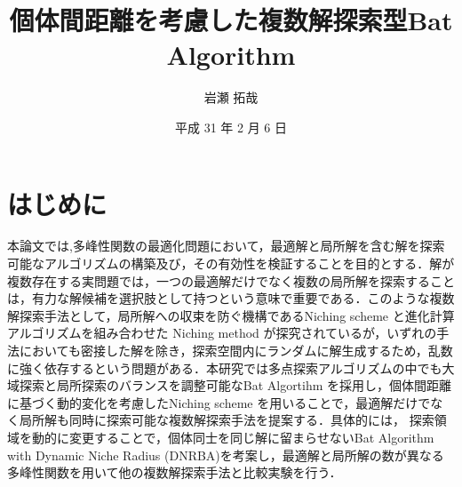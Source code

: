 \documentclass[twocolumn, a4paper]{UECIEresume}
\title{個体間距離を考慮した複数解探索型Bat Algorithm}
\date{平成 31 年 2 月 6 日}
\affiliation{情報学専攻 メディア情報学 プログラム}
\author{岩瀬 拓哉}
\begin{document}
\maketitle

\section{はじめに}
本論文では,多峰性関数の最適化問題において，最適解と局所解を含む解を探索可能なアルゴリズムの構築及び，その有効性を検証することを目的とする．解が複数存在する実問題では，一つの最適解だけでなく複数の局所解を探索することは，有力な解候補を選択肢として持つという意味で重要である．このような複数解探索手法として，局所解への収束を防ぐ機構であるNiching scheme と進化計算アルゴリズムを組み合わせた Niching method が探究されているが，いずれの手法においても密接した解を除き，探索空間内にランダムに解生成するため，乱数に強く依存するという問題がある．本研究では多点探索アルゴリズムの中でも大域探索と局所探索のバランスを調整可能なBat Algortihm を採用し，個体間距離に基づく動的変化を考慮したNiching scheme を用いることで，最適解だけでなく局所解も同時に探索可能な複数解探索手法を提案する．具体的には，
探索領域を動的に変更することで，個体同士を同じ解に留まらせないBat Algorithm with Dynamic Niche Radius (DNRBA)を考案し，最適解と局所解の数が異なる多峰性関数を用いて他の複数解探索手法と比較実験を行う．
\end{document}
